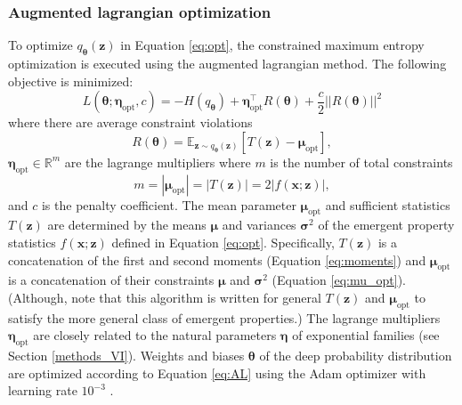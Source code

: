 \documentclass[11pt]{article}
\begin{document}
\subsubsection{Augmented lagrangian optimization}\label{methods_AL_opt}
To optimize $q_{\bm{\theta}}(\mathbf{z})$ in Equation \ref{eq:opt}, the constrained maximum entropy optimization is executed using the augmented lagrangian method.  
The following objective is minimized:
\begin{equation} \label{eq:AL}
L(\bm{\theta}; \bm{\eta}_{\text{opt}}, c) = -H(q_{\bm{\theta}}) + \bm{\eta}_{\text{opt}}^\top R(\bm{\theta}) + \frac{c}{2}||R(\bm{\theta})||^2
\end{equation}
where there are average constraint violations 
\begin{equation}
R(\bm{\theta}) = \mathbb{E}_{\mathbf{z} \sim q_{\bm{\theta}}(\mathbf{z})}\left[T(\mathbf{z}) - \bm{\mu}_{\text{opt}} \right],
\end{equation}
 $\bm{\eta}_{\text{opt}} \in \mathbb{R}^m$ are the lagrange multipliers where $m$ is the number of total constraints
\begin{equation}
m = |\bm{\mu}_{\text{opt}}| = |T(\mathbf{z})| = 2|f(\mathbf{x}; \mathbf{z})|,
\end{equation}
and $c$ is the penalty coefficient. 
The mean parameter $\bm{\mu}_{\text{opt}}$ and sufficient statistics $T(\mathbf{z})$ are determined by the means $\bm{\mu}$ and variances $\bm{\sigma}^2$ of the emergent property statistics $f(\mathbf{x}; \mathbf{z})$ defined in Equation \ref{eq:opt}.
Specifically, $T(\mathbf{z})$ is a concatenation of the first and second moments (Equation \ref{eq:moments}) and $\bm{\mu}_{\text{opt}}$ is a concatenation of their constraints $\bm{\mu}$ and $\bm{\sigma}^2$ (Equation \ref{eq:mu_opt}).
(Although, note that this algorithm is written for general $T(\mathbf{z})$ and $\bm{\mu}_{\text{opt}}$ to satisfy the more general class of emergent properties.)
The lagrange multipliers $\bm{\eta}_{\text{opt}}$ are closely related to the natural parameters $\bm{\eta}$ of exponential families (see Section \ref{methods_VI}).
Weights and biases $\bm{\theta}$ of the deep probability distribution are optimized according to Equation \ref{eq:AL} using the Adam optimizer with learning rate $10^{-3}$ \cite{kingma2014adam}.
\end{document}
